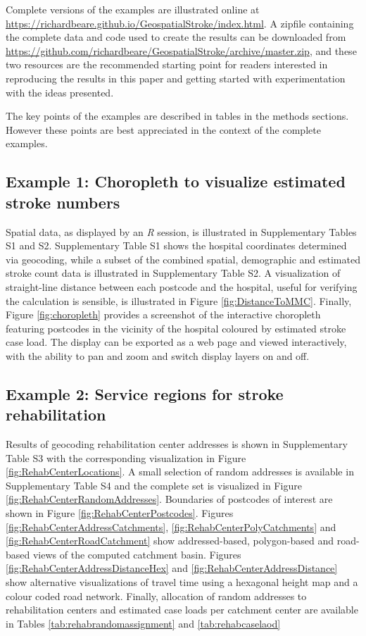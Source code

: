 \documentclass[utf8]{frontiersHLTH}
\begin{document}
Complete versions of the examples are illustrated online at
\url{https://richardbeare.github.io/GeospatialStroke/index.html}.  A
zipfile containing the complete data and code used to create the
results can be downloaded from
\url{https://github.com/richardbeare/GeospatialStroke/archive/master.zip},
and these two resources are the recommended starting point for readers
interested in reproducing the results in this paper and getting
started with experimentation with the ideas presented.

The key points of the examples are described in tables in the methods
sections. However these points are best appreciated in the context of
the complete examples.

\subsection{Example 1: Choropleth to visualize estimated stroke numbers} 
Spatial data, as displayed by an {\em R} session, is illustrated in
Supplementary Tables S1 and S2. Supplementary Table S1 shows the
hospital coordinates determined via geocoding, while a subset of the
combined spatial, demographic and estimated stroke count data is
illustrated in Supplementary Table S2. A visualization of
straight-line distance between each postcode and the hospital, useful
for verifying the calculation is sensible, is illustrated in Figure
\ref{fig:DistanceToMMC}. Finally, Figure \ref{fig:choropleth} provides
a screenshot of the interactive choropleth featuring postcodes in the
vicinity of the hospital coloured by estimated stroke case load. The
display can be exported as a web page and viewed interactively, with
the ability to pan and zoom and switch display layers on and off.

\subsection{Example 2: Service regions for stroke rehabilitation} 
Results of geocoding rehabilitation center addresses is shown in Supplementary
Table S3 with the corresponding visualization in Figure
\ref{fig:RehabCenterLocations}. A small selection of random addresses
is available in Supplementary Table S4 and the complete set is
visualized in Figure \ref{fig:RehabCenterRandomAddresses}. Boundaries
of postcodes of interest are shown in Figure
\ref{fig:RehabCenterPostcodes}. Figures
\ref{fig:RehabCenterAddressCatchments},
\ref{fig:RehabCenterPolyCatchments} and
\ref{fig:RehabCenterRoadCatchment} show addressed-based, polygon-based
and road-based views of the computed catchment basin. Figures
\ref{fig:RehabCenterAddressDistanceHex} and
\ref{fig:RehabCenterAddressDistance} show alternative visualizations
of travel time using a hexagonal height map and a colour coded road
network. Finally, allocation of random addresses to rehabilitation
centers and estimated case loads per catchment center are available in
Tables \ref{tab:rehabrandomassignment} and \ref{tab:rehabcaselaod}
\end{document}
